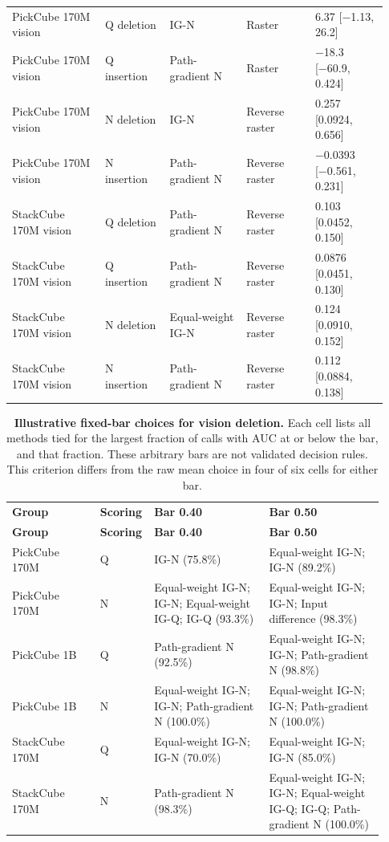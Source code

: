 \begin{longtable}{p{0.230\linewidth} p{0.160\linewidth} p{0.190\linewidth} p{0.170\linewidth} p{0.180\linewidth}}
PickCube 170M vision & Q deletion & IG-N & Raster & 6.37 [−1.13, 26.2] \\
PickCube 170M vision & Q insertion & Path-gradient N & Raster & −18.3 [−60.9, 0.424] \\
PickCube 170M vision & N deletion & IG-N & Reverse raster & 0.257 [0.0924, 0.656] \\
PickCube 170M vision & N insertion & Path-gradient N & Reverse raster & −0.0393 [−0.561, 0.231] \\
StackCube 170M vision & Q deletion & Path-gradient N & Reverse raster & 0.103 [0.0452, 0.150] \\
StackCube 170M vision & Q insertion & Path-gradient N & Reverse raster & 0.0876 [0.0451, 0.130] \\
StackCube 170M vision & N deletion & Equal-weight IG-N & Reverse raster & 0.124 [0.0910, 0.152] \\
StackCube 170M vision & N insertion & Path-gradient N & Reverse raster & 0.112 [0.0884, 0.138] \\
\end{longtable}

\setlength{\tabcolsep}{2pt}
\begin{longtable}{p{0.230\linewidth} p{0.090\linewidth} p{0.300\linewidth} p{0.300\linewidth}}
\noalign{\addtocounter{table}{-1}}
\caption*{\textbf{Illustrative fixed-bar choices for vision deletion.} Each cell lists all methods tied for the largest fraction of calls with AUC at or below the bar, and that fraction. These arbitrary bars are not validated decision rules. This criterion differs from the raw mean choice in four of six cells for either bar.}\\
\toprule
\textbf{Group} & \textbf{Scoring} & \textbf{Bar 0.40} & \textbf{Bar 0.50} \\
\midrule\endfirsthead
\toprule
\textbf{Group} & \textbf{Scoring} & \textbf{Bar 0.40} & \textbf{Bar 0.50} \\
\midrule\endhead
\bottomrule\endfoot
PickCube 170M & Q & IG-N (75.8\%) & Equal-weight IG-N; IG-N (89.2\%) \\
PickCube 170M & N & Equal-weight IG-N; IG-N; Equal-weight IG-Q; IG-Q (93.3\%) & Equal-weight IG-N; IG-N; Input difference (98.3\%) \\
PickCube 1B & Q & Path-gradient N (92.5\%) & Equal-weight IG-N; IG-N; Path-gradient N (98.8\%) \\
PickCube 1B & N & Equal-weight IG-N; IG-N; Path-gradient N (100.0\%) & Equal-weight IG-N; IG-N; Path-gradient N (100.0\%) \\
StackCube 170M & Q & Equal-weight IG-N; IG-N (70.0\%) & Equal-weight IG-N; IG-N (85.0\%) \\
StackCube 170M & N & Path-gradient N (98.3\%) & Equal-weight IG-N; IG-N; Equal-weight IG-Q; IG-Q; Path-gradient N (100.0\%) \\
\end{longtable}

